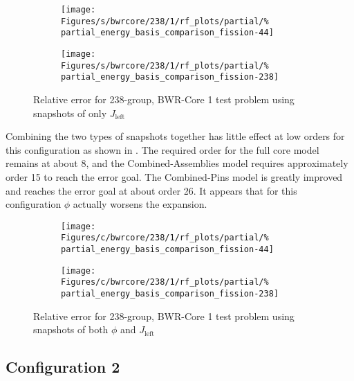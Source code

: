 \begin{figure*}[tb]
    \centering
    \begin{subfigure}{0.5\textwidth}
        \centering
    \texttt{[image: Figures/s/bwrcore/238/1/rf\_plots/partial/\%
        partial\_energy\_basis\_comparison\_fission-44]}
    \end{subfigure}%
    \begin{subfigure}{0.5\textwidth}
        \centering
    \texttt{[image: Figures/s/bwrcore/238/1/rf\_plots/partial/\%
        partial\_energy\_basis\_comparison\_fission-238]}
    \end{subfigure}
    \caption{Relative error for 238-group, BWR-Core 1 test problem using 
        snapshots of only $J_{\text{left}}$}
    \label{fig:BWR1_partial-238}
\end{figure*}

Combining the two types of snapshots together has little effect at low orders 
for this configuration as shown in .  The 
required order for the full core model remains at about 8, and the 
Combined-Assemblies model requires approximately order 15 to reach the error 
goal.  The 
Combined-Pins model is greatly improved and reaches the error goal at about 
order 
26.  It appears that for this configuration $\phi$ actually worsens the 
expansion.

\begin{figure*}[tb]
    \centering
    \begin{subfigure}{0.5\textwidth}
        \centering
    \texttt{[image: Figures/c/bwrcore/238/1/rf\_plots/partial/\%
        partial\_energy\_basis\_comparison\_fission-44]}
    \end{subfigure}%
    \begin{subfigure}{0.5\textwidth}
        \centering
    \texttt{[image: Figures/c/bwrcore/238/1/rf\_plots/partial/\%
        partial\_energy\_basis\_comparison\_fission-238]}
    \end{subfigure}
    \caption{Relative error for 238-group, BWR-Core 1 test problem using 
        snapshots of both $\phi$ and $J_{\text{left}}$}
    \label{fig:BWR1_combined-238}
\end{figure*}

\subsection{Configuration 2}

